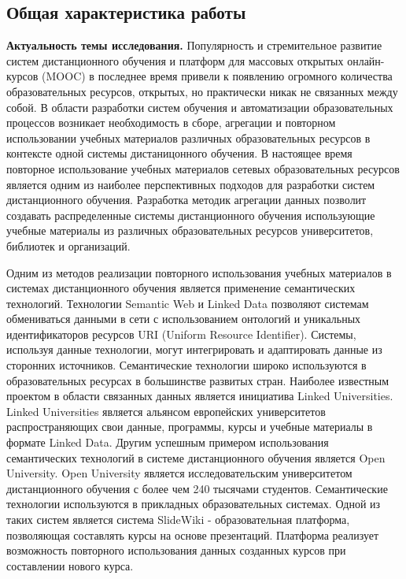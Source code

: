 \subsection*{\Large Общая характеристика работы}
\fontsize{14pt}{15pt}\selectfont


\textbf{Актуальность темы исследования.}
Популярность и стремительное развитие систем дистанционного обучения и платформ для массовых открытых онлайн-курсов (MOOC) в последнее время привели к появлению огромного количества образовательных ресурсов, открытых, но практически никак не связанных между собой. В области разработки систем обучения и автоматизации образовательных процессов возникает необходимость в сборе, агрегации и повторном использовании учебных материалов различных образовательных ресурсов в контексте одной системы дистаницонного обучения. В настоящее время повторное использование учебных материалов сетевых образовательных ресурсов является одним из наиболее перспективных подходов для разработки систем дистанционного обучения. Разработка методик агрегации данных позволит создавать распределенные системы дистанционного обучения использующие учебные материалы из различных образовательных ресурсов университетов, библиотек и организаций.

Одним из методов реализации повторного использования учебных материалов в системах дистанционного обучения является применение семантических технологий. Технологии Semantic Web и Linked Data позволяют системам обмениваться данными в сети с использованием онтологий и уникальных идентификаторов ресурсов URI (Uniform Resource Identifier). Системы, используя данные технологии, могут интегрировать и адаптировать данные из сторонних источников. Семантические технологии широко используются в образовательных ресурсах в большинстве развитых стран. Наиболее известным проектом в области связанных данных является инициатива Linked Universities. Linked Universities является альянсом европейских университетов распространяющих свои данные, программы, курсы и учебные материалы в формате Linked Data.
Другим успешным примером использования семантических технологий в системе дистанционного обучения является Open University. Open University является исследовательским университетом дистанционного обучения с более чем 240 тысячами студентов. Семантические технологии используются в прикладных образовательных системах. Одной из таких систем является система SlideWiki - образовательная платформа, позволяющая составлять курсы на основе презентаций. Платформа реализует возможность повторного использования данных созданных курсов при составлении нового курса.

